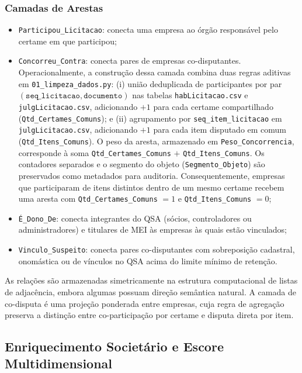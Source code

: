 \subsubsection{Camadas de Arestas}

\begin{itemize}
  \item \texttt{Participou\_Licitacao}: conecta uma empresa ao órgão responsável pelo certame em que participou;
  \item \texttt{Concorreu\_Contra}: conecta pares de empresas co-disputantes. Operacionalmente, a construção dessa camada combina duas regras aditivas em \texttt{01\_limpeza\_dados.py}: (i) união deduplicada de participantes por par $(\texttt{seq\_licitacao}, \texttt{documento})$ nas tabelas \texttt{habLicitacao.csv} e \texttt{julgLicitacao.csv}, adicionando $+1$ para cada certame compartilhado (\texttt{Qtd\_Certames\_Comuns}); e (ii) agrupamento por \texttt{seq\_item\_licitacao} em \texttt{julgLicitacao.csv}, adicionando $+1$ para cada item disputado em comum (\texttt{Qtd\_Itens\_Comuns}). O peso da aresta, armazenado em \texttt{Peso\_Concorrencia}, corresponde à soma \texttt{Qtd\_Certames\_Comuns} $+$ \texttt{Qtd\_Itens\_Comuns}. Os contadores separados e o segmento do objeto (\texttt{Segmento\_Objeto}) são preservados como metadados para auditoria. Consequentemente, empresas que participaram de itens distintos dentro de um mesmo certame recebem uma aresta com \texttt{Qtd\_Certames\_Comuns} $= 1$ e \texttt{Qtd\_Itens\_Comuns} $= 0$;
  \item \texttt{É\_Dono\_De}: conecta integrantes do QSA (sócios, controladores ou administradores) e titulares de MEI às empresas às quais estão vinculados;
  \item \texttt{Vinculo\_Suspeito}: conecta pares co-disputantes com sobreposição cadastral, onomástica ou de vínculos no QSA acima do limite mínimo de retenção.
\end{itemize}

As relações são armazenadas simetricamente na estrutura computacional de listas de adjacência, embora algumas possuam direção semântica natural. A camada de co-disputa é uma projeção ponderada entre empresas, cuja regra de agregação preserva a distinção entre co-participação por certame e disputa direta por item.

\subsection{Enriquecimento Societário e Escore Multidimensional}

